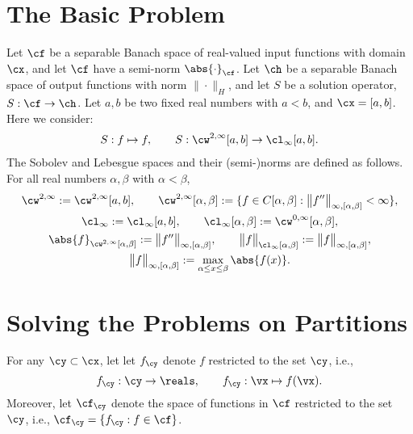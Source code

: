 \documentclass[]{elsarticle}
\theoremstyle{definition}
\theoremstyle{remark}
\newcommand{\Fnorm}[1]{\abs{#1}_{\cf}}
\begin{document}
\section{The Basic Problem}
Let $\cf$ be a separable Banach space of real-valued input functions with domain $\cx$, and let $\cf$ have a semi-norm $\Fnorm{\cdot}$.  Let $\ch$ be a separable Banach space of output functions with norm $\|\cdot\|_{H}$, and let $S$ be a solution operator, $S:\cf \to \ch$.  Let $a, b$ be two fixed real numbers with $a<b$, and $\cx=[a,b]$.  Here we consider:
\begin{align*}
S: f \mapsto f, \qquad S:\cw^{2,\infty}[a,b] \to \cl_{\infty}[a,b].
\end{align*}
The Sobolev and Lebesgue spaces and their (semi-)norms are defined as follows.  For all real numbers $\alpha, \beta$ with $\alpha < \beta$,
\begin{gather*}
\cw^{2,\infty}:=\cw^{2,\infty}[a,b], \qquad \cw^{2,\infty}[\alpha,\beta]:=\{f\in C[\alpha,\beta]: \bigl \lVert f''\bigr \rVert_{\infty,[\alpha,\beta]} <\infty\}, \\
\cl_{\infty}:=\cl_{\infty}[a,b], \qquad
\cl_{\infty}[\alpha,\beta]:=\cw^{0,\infty}[\alpha,\beta],\\
\abs{f}_{\cw^{2,\infty}[\alpha,\beta]} :=  \bigl \lVert f'' \bigr \rVert_{\infty,[\alpha,\beta]}, \qquad
\bigl \lVert f \bigr \rVert_{\cl_{\infty}[\alpha,\beta]} :=  \bigl \lVert f \bigr \rVert_{\infty,[\alpha,\beta]}, \\
\bigl \lVert f \bigr \rVert_{\infty,[\alpha,\beta]} := \max_{\alpha \le x  \le \beta} \abs{f(x)}. \end{gather*}

\section{Solving the Problems on Partitions}
For any $\cy \subset \cx$, let let $f_{\cy}$ denote $f$ restricted to the set $\cy$, i.e.,
\begin{equation*}
f_{\cy}:\cy \to \reals, \qquad f_{\cy} :\vx \mapsto f(\vx).
\end{equation*}
Moreover, let $\cf_{\cy}$ denote the space of functions in $\cf$ restricted to the set $\cy$, i.e., $\cf_{\cy} = \{f_{\cy} : f \in \cf \}$.
\end{document}
